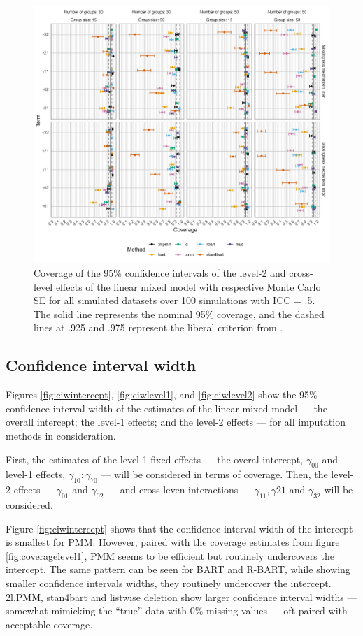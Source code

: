 \documentclass[preprint,12pt]{elsarticle}
\begin{document}
\begin{figure}[H]
    \centering
    \includegraphics[width=1\textwidth]{coveragelevel2.png}
    \caption{Coverage of the 95\% confidence intervals of the level-2 and cross-level effects of the linear mixed model with respective Monte Carlo SE for all simulated datasets over 100 simulations with ICC = .5. The solid line represents the nominal 95\% coverage, and the dashed lines at .925 and .975 represent the liberal criterion from \citet{bradley1978}.}
    \label{fig:coveragelevel2}
\end{figure}

\subsection{Confidence interval width}
Figures \ref{fig:ciwintercept}, \ref{fig:ciwlevel1}, and \ref{fig:ciwlevel2} show the 95\% confidence interval width of the estimates of the linear mixed model --- the overall intercept; the level-1 effects; and the level-2 effects --- for all imputation methods in consideration.

First, the estimates of the level-1 fixed effects --- the overal intercept, $\gamma_{00}$ and level-1 effects, $\gamma_{10}:\gamma_{70}$ --- will be considered in terms of coverage. Then, the level-2 effects --- $\gamma_{01}$ and $\gamma_{02}$ --- and cross-leven interactions --- $\gamma_{11}, \gamma{21}$ and $\gamma_{32}$ will be considered.

Figure \ref{fig:ciwintercept} shows that the confidence interval width of the intercept is smallest for PMM. However, paired with the coverage estimates from figure \ref{fig:coveragelevel1}, PMM seems to be efficient but routinely undercovers the intercept. The same pattern can be seen for BART and R-BART, while showing smaller confidence intervals widths, they routinely undercover the intercept. 2l.PMM, stan4bart and listwise deletion show larger confidence interval widths --- somewhat mimicking the ``true'' data with 0\% missing values --- oft paired with acceptable coverage.
\end{document}
